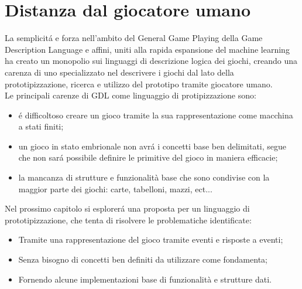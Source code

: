 \section{Distanza dal giocatore umano}
La semplicitá e forza nell'ambito del General Game Playing della Game Description Language e affini, 
uniti alla rapida espansione del machine learning ha creato un monopolio sui linguaggi di descrizione
logica dei giochi, creando una carenza di uno specializzato nel descrivere i giochi dal
lato della prototipizzazione, ricerca e utilizzo del prototipo tramite giocatore umano. \\ 
Le principali carenze di GDL come linguaggio di protipizzazione sono:
\begin{itemize}
    \item { 
        é difficoltoso creare un gioco tramite la sua rappresentazione come macchina a stati finiti; 
    }
    \item {
        un gioco in stato embrionale non avrá i concetti base ben delimitati, segue che non sará 
        possibile definire le primitive del gioco in maniera efficacie;
    }
    \item {
        la mancanza di strutture e funzionalità base che sono condivise con la maggior parte dei         
        giochi: carte, tabelloni, mazzi, ect...
    }
\end{itemize}
Nel prossimo capitolo si esplorerá una proposta per un linguaggio di prototipizzazione, che 
tenta di risolvere le problematiche identificate:
\begin{itemize}
    \item Tramite una rappresentazione del gioco tramite eventi e risposte a eventi;
    \item Senza bisogno di concetti ben definiti da utilizzare come fondamenta;
    \item Fornendo alcune implementazioni base di funzionalità e strutture dati.
\end{itemize}